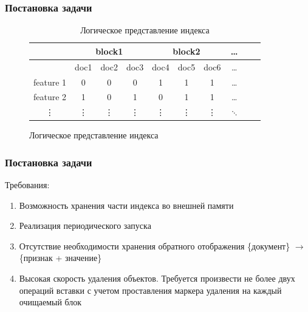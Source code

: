 \documentclass[aspectratio=169, pdf, 8pt, unicode]{beamer}
\begin{document}
\begin{frame}[fragile]
\frametitle{Постановка задачи}
\begin{figure}[H]
\centering
\begin{table}[H]
\caption{Логическое представление индекса}
\centering
\small
\singlespacing
\begin{tabular}{|c|c|c|c|c|c|c|c|c|c|}
    \hline
                &\multicolumn{3}{c|}{block1}&\multicolumn{3}{c|}{block2}& \ldots \\ \hline
                & doc1  & doc2  & doc3      & doc4  & doc5      & doc6  & \ldots \\ \hline
    feature 1   & 0     & 0     & 0         & 1     & 1         & 1     & \ldots \\ \hline
    feature 2   & 1     & 0     & 1         & 0     & 1         & 1     & \ldots \\ \hline
    \vdots      & \vdots& \vdots& \vdots    & \vdots& \vdots    &\vdots & $\ddots$ \\ \hline
\end{tabular}
\label{index}
\end{table}
\end{figure}
\end{frame}

\begin{frame}[fragile]
\frametitle{Постановка задачи}
{\large Требования:}
\vspace{5mm}
\begin{enumerate}
\item Возможность хранения части индекса во внешней памяти
\vspace{5mm}
\item Реализация периодического запуска
\vspace{5mm}
\item Отсутствие необходимости хранения обратного отображения \{документ\} $\rightarrow$
    \{признак + значение\}
\vspace{5mm}
\item Высокая скорость удаления объектов. Требуется произвести не более двух операций
вставки с учетом проставления маркера удаления на каждый очищаемый блок
\end{enumerate}
\end{frame}
\end{document}
